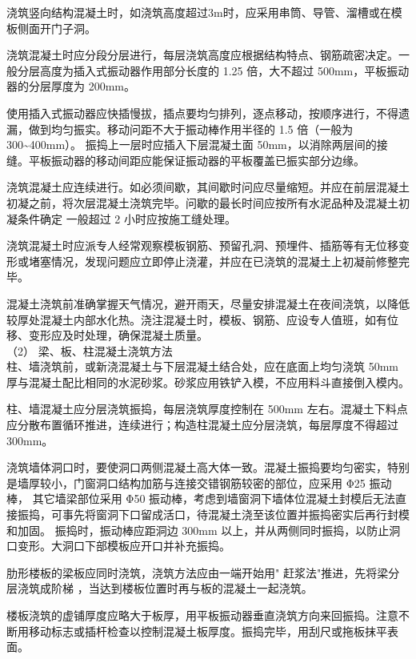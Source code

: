  浇筑竖向结构混凝土时，如浇筑高度超过3m时，应采用串筒、导管、溜槽或在模板侧面开门子洞。

 浇筑混凝土时应分段分层进行，每层浇筑高度应根据结构特点、钢筋疏密决定。一般分层高度为插入式振动器作用部分长度的 1.25 倍，大不超过 500mm，平板振动器的分层厚度为 200mm。

 使用插入式振动器应快插慢拔，插点要均匀排列，逐点移动，按顺序进行，不得遗漏，做到均匀振实。移动问距不大于振动棒作用半径的 1.5 倍（一般为 300\textasciitilde400mm）。
振捣上一层时应插入下层混凝土面 50mm，以消除两层间的接缝。平板振动器的移动间距应能保证振动器的平板覆盖已振实部分边缘。

 浇筑混凝土应连续进行。如必须间歇，其间歇时问应尽量缩短。并应在前层混凝土初凝之前，将次层混凝土浇筑完毕。问歇的最长时间应按所有水泥品种及混凝土初凝条件确定
一般超过 2 小时应按施工缝处理。

 浇筑混凝土时应派专人经常观察模板钢筋、预留孔洞、预埋件、插筋等有无位移变形或堵塞情况，发现问题应立即停止浇灌，并应在已浇筑的混凝土上初凝前修整完毕。

 混凝土浇筑前准确掌握天气情况，避开雨天，尽量安排混凝土在夜间浇筑，以降低较厚处混凝土内部水化热。浇注混凝土时，模板、钢筋、应设专人值班，如有位移、变形应及时处理，确保混凝土质量。\\

（2） 梁、板、柱混凝土浇筑方法\\

 柱、墙浇筑前，或新浇混凝土与下层混凝土结合处，应在底面上均匀浇筑 50mm 厚与混凝土配比相同的水泥砂浆。砂浆应用铁铲入模，不应用料斗直接倒入模内。

 柱、墙混凝土应分层浇筑振捣，每层浇筑厚度控制在 500mm 左右。混凝土下料点应分散布置循环推进，连续进行；构造柱混凝土应分层浇筑，每层厚度不得超过 300mm。

 浇筑墙体洞口时，要使洞口两侧混凝土高大体一致。混凝土振捣要均匀密实，特别是墙厚较小，门窗洞口结构加筋与连接交错钢筋较密的部位，应采用 Φ25 振动棒，
其它墙梁部位采用 Φ50 振动棒，考虑到墙窗洞下墙体位混凝土封模后无法直接振捣，可事先将窗洞下口留成活口，待混凝土浇至该位置并振捣密实后再行封模和加固。
振捣时，振动棒应距洞边 300mm 以上，并从两侧同时振捣，以防止洞口变形。大洞口下部模板应开口并补充振捣。

 肋形楼板的梁板应同时浇筑，浇筑方法应由一端开始用" 赶浆法"推进，先将梁分层浇筑成阶梯 ，当达到楼板位置时再与板的混凝土一起浇筑。

 楼板浇筑的虚铺厚度应略大于板厚，用平板振动器垂直浇筑方向来回振捣。注意不断用移动标志或插杆检查以控制混凝土板厚度。振捣完毕，用刮尺或拖板抹平表面。

